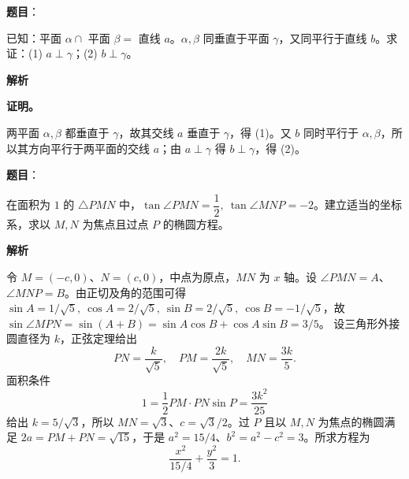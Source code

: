 \begin{answer}

\textbf{题目}：

已知：平面 $\alpha\cap$ 平面 $\beta=$ 直线 $a$。$\alpha,\beta$ 同垂直于平面 $\gamma$，又同平行于直线 $b$。求证：(1) $a\perp\gamma$；(2) $b\perp\gamma$。

\textbf{解析}

\textbf{证明。}

两平面 $\alpha,\beta$ 都垂直于 $\gamma$，故其交线 $a$ 垂直于 $\gamma$，得 (1)。又 $b$ 同时平行于 $\alpha,\beta$，所以其方向平行于两平面的交线 $a$；由 $a\perp\gamma$ 得 $b\perp\gamma$，得 (2)。


\end{answer}
\begin{answer}

\textbf{题目}：

在面积为 $1$ 的 $\triangle PMN$ 中，$\tan\angle PMN=\dfrac12,\ \tan\angle MNP=-2$。建立适当的坐标系，求以 $M,N$ 为焦点且过点 $P$ 的椭圆方程。

\textbf{解析}

令 $M=(-c,0)$、$N=(c,0)$，中点为原点，$MN$ 为 $x$ 轴。设 $\angle PMN=A$、$\angle MNP=B$。由正切及角的范围可得
$\sin A=1/\sqrt5,\ \cos A=2/\sqrt5,\ \sin B=2/\sqrt5,\ \cos B=-1/\sqrt5$，故
$\sin\angle MPN=\sin(A+B)=\sin A\cos B+\cos A\sin B=3/5$。
设三角形外接圆直径为 $k$，正弦定理给出
\nopagebreak[4]
\[
PN=\frac{k}{\sqrt5},\quad PM=\frac{2k}{\sqrt5},\quad MN=\frac{3k}{5}.
\]
面积条件
\nopagebreak[4]
\[
1=\frac12 PM\cdot PN\sin P=\frac{3k^2}{25}
\]
给出 $k=5/\sqrt3$，所以 $MN=\sqrt3$、$c=\sqrt3/2$。过 $P$ 且以 $M,N$ 为焦点的椭圆满足 $2a=PM+PN=\sqrt{15}$，于是 $a^2=15/4$、$b^2=a^2-c^2=3$。所求方程为
\nopagebreak[4]
\[
\frac{x^2}{15/4}+\frac{y^2}{3}=1.
\]


\end{answer}